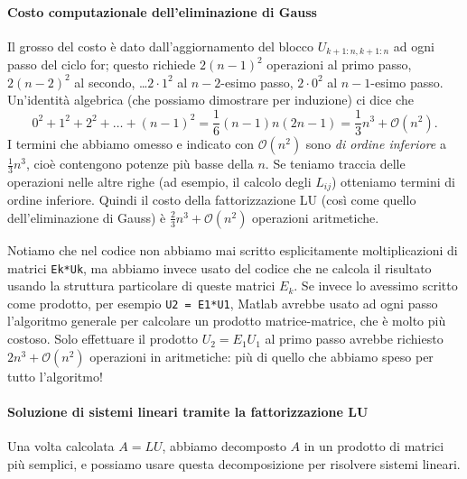 \documentclass[a4paper]{report}
\theoremstyle{definiton}
\theoremstyle{remark}
\begin{document}
\paragraph{Costo computazionale dell'eliminazione di Gauss}

Il grosso del costo è dato dall'aggiornamento del blocco $U_{k+1:n, k+1:n}$ ad ogni passo del ciclo for; questo richiede $2(n-1)^2$ operazioni al primo passo, $2(n-2)^2$ al secondo, \dots $2\cdot 1^2$ al $n-2$-esimo passo, $2\cdot 0^2$ al $n-1$-esimo passo. Un'identità algebrica (che possiamo dimostrare per induzione) ci dice che
\[
0^2+1^2 + 2^2 + \dots + (n-1)^2 = \frac{1}{6}(n-1)n(2n-1) = \frac13n^3 + \mathcal{O}(n^2).
\]
I termini che abbiamo omesso e indicato con $\mathcal{O}(n^2)$ sono \emph{di ordine inferiore} a $\frac13 n^3$, cioè contengono potenze più basse della $n$. Se teniamo traccia delle operazioni nelle altre righe (ad esempio, il calcolo degli $L_{ij}$) otteniamo termini di ordine inferiore. Quindi il costo della fattorizzazione LU (così come quello dell'eliminazione di Gauss) è $\frac23 n^3 + \mathcal{O}(n^2)$ operazioni aritmetiche.

Notiamo che nel codice non abbiamo mai scritto esplicitamente moltiplicazioni di matrici \lstinline{Ek*Uk}, ma abbiamo invece usato del codice che ne calcola il risultato usando la struttura particolare di queste matrici $E_k$. Se invece lo avessimo scritto come prodotto, per esempio \lstinline{U2 = E1*U1}, Matlab avrebbe usato ad ogni passo l'algoritmo generale per calcolare un prodotto matrice-matrice, che è molto più costoso. Solo effettuare il prodotto $U_2 = E_1 U_1$ al primo passo avrebbe richiesto $2n^3 + \mathcal{O}(n^2)$ operazioni in aritmetiche: più di quello che abbiamo speso per tutto l'algoritmo!

\paragraph{Soluzione di sistemi lineari tramite la fattorizzazione LU} 
Una volta calcolata $A = LU$, abbiamo decomposto $A$ in un prodotto di matrici più semplici, e possiamo usare questa decomposizione per risolvere sistemi lineari. 
\end{document}
